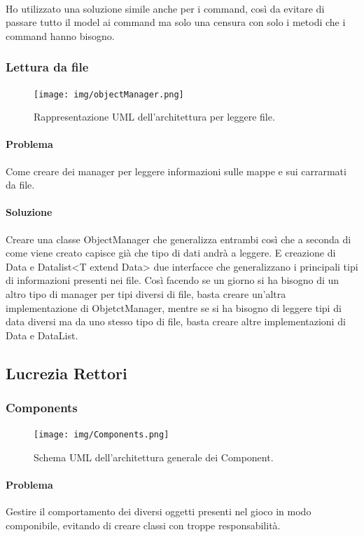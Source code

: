 \documentclass[a4paper,12pt]{report}
\begin{document}
\paragraph{} Ho utilizzato una soluzione simile anche per i command, così da evitare di passare tutto il model ai command ma solo una censura con solo i metodi che i command hanno bisogno.
\newpage
\subsubsection*{Lettura da file}
%
\begin{figure}[H]
	\centering{}
	\texttt{[image: img/objectManager.png]}
	\caption{Rappresentazione UML dell'architettura per leggere file.}
	\label{img:strategy}
	\end{figure}
%	
\paragraph*{Problema} Come creare dei manager per leggere informazioni sulle mappe e sui carrarmati da file.
%
\paragraph*{Soluzione} Creare una classe ObjectManager che generalizza entrambi così che a seconda di come viene creato capisce già che tipo di dati andrà a leggere. E creazione di Data e Datalist<T extend Data> due interfacce che generalizzano i principali tipi di informazioni presenti nei file. Così facendo se un giorno si ha bisogno di un altro tipo di manager per tipi diversi di file, basta creare un’altra implementazione di ObjetctManager, mentre se si ha bisogno di leggere tipi di data diversi ma da uno stesso tipo di file, basta creare altre implementazioni di Data e DataList.
%
\newpage
\subsection*{Lucrezia Rettori}
%
\subsubsection*{Components}
%
\begin{figure}[H]
    \centering{}
    \texttt{[image: img/Components.png]}
    \caption{Schema UML dell'architettura generale dei Component.}
\end{figure}
%
\paragraph*{Problema}
Gestire il comportamento dei diversi oggetti presenti nel gioco in modo componibile, evitando di creare classi con troppe responsabilità.
\end{document}
